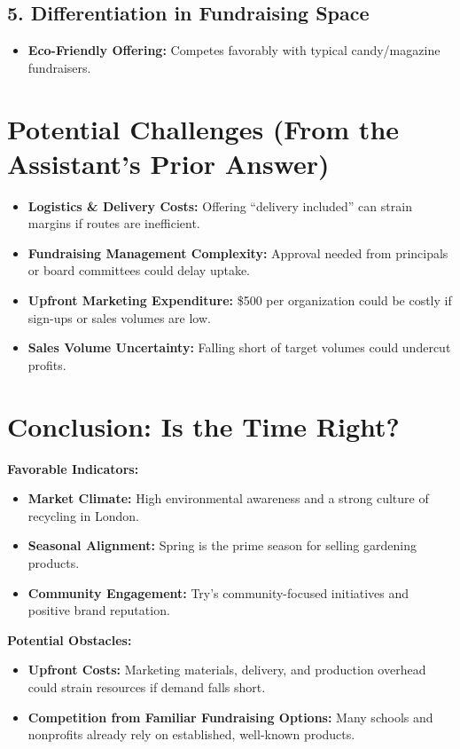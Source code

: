 \documentclass[12pt]{article}
\begin{document}
\subsection*{5. Differentiation in Fundraising Space}
\begin{itemize}
    \item \textbf{Eco-Friendly Offering:} Competes favorably with typical candy/magazine fundraisers.
\end{itemize}

\section*{Potential Challenges (From the Assistant's Prior Answer)}

\begin{itemize}
    \item \textbf{Logistics \& Delivery Costs:} Offering ``delivery included'' can strain margins if routes are inefficient.
    \item \textbf{Fundraising Management Complexity:} Approval needed from principals or board committees could delay uptake.
    \item \textbf{Upfront Marketing Expenditure:} \$500 per organization could be costly if sign-ups or sales volumes are low.
    \item \textbf{Sales Volume Uncertainty:} Falling short of target volumes could undercut profits.
\end{itemize}

\section*{Conclusion: Is the Time Right?}

\textbf{Favorable Indicators:}
\begin{itemize}
    \item \textbf{Market Climate:} High environmental awareness and a strong culture of recycling in London.
    \item \textbf{Seasonal Alignment:} Spring is the prime season for selling gardening products.
    \item \textbf{Community Engagement:} Try’s community-focused initiatives and positive brand reputation.
\end{itemize}

\noindent
\textbf{Potential Obstacles:}
\begin{itemize}
    \item \textbf{Upfront Costs:} Marketing materials, delivery, and production overhead could strain resources if demand falls short.
    \item \textbf{Competition from Familiar Fundraising Options:} Many schools and nonprofits already rely on established, well-known products.
\end{itemize}
\end{document}
